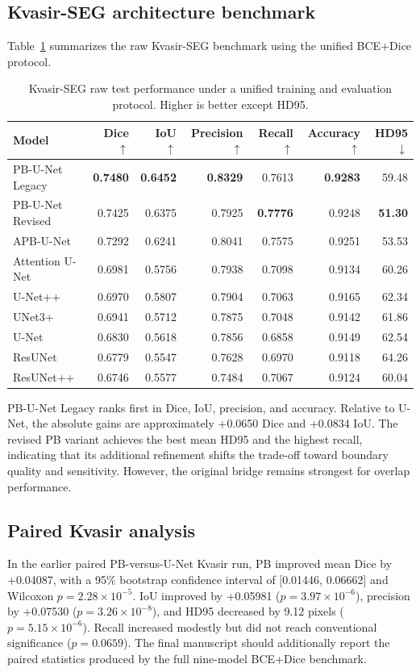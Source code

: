 \documentclass[11pt]{article}
\begin{document}
\subsection{Kvasir-SEG architecture benchmark}
Table~\ref{tab:kvasir-benchmark} summarizes the raw Kvasir-SEG benchmark using the unified BCE+Dice protocol.

\begin{table}[t]
\centering
\caption{Kvasir-SEG raw test performance under a unified training and evaluation protocol. Higher is better except HD95.}
\label{tab:kvasir-benchmark}
\small
\begin{tabular}{lrrrrrr}
\toprule
Model & Dice $\uparrow$ & IoU $\uparrow$ & Precision $\uparrow$ & Recall $\uparrow$ & Accuracy $\uparrow$ & HD95 $\downarrow$ \\
\midrule
PB-U-Net Legacy & \textbf{0.7480} & \textbf{0.6452} & \textbf{0.8329} & 0.7613 & \textbf{0.9283} & 59.48 \\
PB-U-Net Revised & 0.7425 & 0.6375 & 0.7925 & \textbf{0.7776} & 0.9248 & \textbf{51.30} \\
APB-U-Net & 0.7292 & 0.6241 & 0.8041 & 0.7575 & 0.9251 & 53.53 \\
Attention U-Net & 0.6981 & 0.5756 & 0.7938 & 0.7098 & 0.9134 & 60.26 \\
U-Net++ & 0.6970 & 0.5807 & 0.7904 & 0.7063 & 0.9165 & 62.34 \\
UNet3+ & 0.6941 & 0.5712 & 0.7875 & 0.7048 & 0.9142 & 61.86 \\
U-Net & 0.6830 & 0.5618 & 0.7856 & 0.6858 & 0.9149 & 62.54 \\
ResUNet & 0.6779 & 0.5547 & 0.7628 & 0.6970 & 0.9118 & 64.26 \\
ResUNet++ & 0.6746 & 0.5577 & 0.7484 & 0.7067 & 0.9124 & 60.04 \\
\bottomrule
\end{tabular}
\end{table}

PB-U-Net Legacy ranks first in Dice, IoU, precision, and accuracy. Relative to U-Net, the absolute gains are approximately +0.0650 Dice and +0.0834 IoU. The revised PB variant achieves the best mean HD95 and the highest recall, indicating that its additional refinement shifts the trade-off toward boundary quality and sensitivity. However, the original bridge remains strongest for overlap performance.

\subsection{Paired Kvasir analysis}
In the earlier paired PB-versus-U-Net Kvasir run, PB improved mean Dice by +0.04087, with a 95\% bootstrap confidence interval of [0.01446, 0.06662] and Wilcoxon $p=2.28\times10^{-5}$. IoU improved by +0.05981 ($p=3.97\times10^{-6}$), precision by +0.07530 ($p=3.26\times10^{-8}$), and HD95 decreased by 9.12 pixels ($p=5.15\times10^{-6}$). Recall increased modestly but did not reach conventional significance ($p=0.0659$). The final manuscript should additionally report the paired statistics produced by the full nine-model BCE+Dice benchmark.
\end{document}
